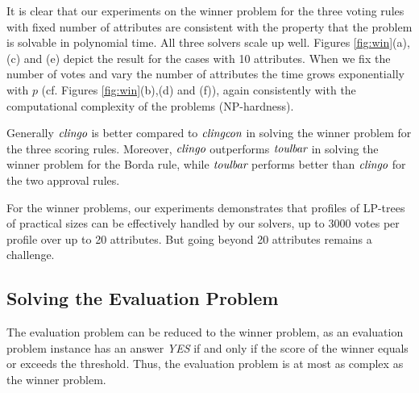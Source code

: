 \begin{figure}[ht!]
\end{figure}


It is clear that our experiments on the winner problem for the three voting rules with 
fixed number of attributes are consistent with the property that the problem
is solvable in polynomial time. All three solvers scale up well.
Figures \ref{fig:win}(a),(c) and (e) depict the result for the cases with 10 attributes.
When we fix the number of votes and vary the number of 
attributes the time grows exponentially with $p$ (cf. Figures \ref{fig:win}(b),(d) and (f)),
again consistently with the computational complexity of the problems (NP-hardness).

Generally $\textit{clingo}$ is better compared to $\textit{clingcon}$ in solving 
the winner problem for the three scoring rules. Moreover,
$\textit{clingo}$ outperforms $\textit{toulbar}$ in solving the winner problem for
the Borda rule, while $\textit{toulbar}$ performs better than $\textit{clingo}$
for the two approval rules.

For the winner problems, our experiments demonstrates that profiles
of LP-trees of practical sizes can be effectively handled by our
solvers, up to 3000 votes per profile over up to 20 attributes.
But going beyond 20 attributes remains a challenge.





\subsection{Solving the Evaluation Problem}
The evaluation problem can be reduced to the winner problem, as
an evaluation problem instance has an answer \textit{YES}
if and only if the score of the winner equals or exceeds the threshold.
Thus, the evaluation problem is at most as complex as
the winner problem.

